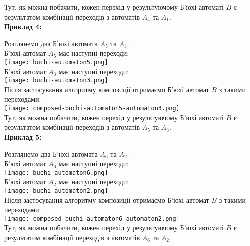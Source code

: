 \documentclass[12pt,a4paper]{article}
\begin{document}
Тут, як можна побачити, кожен перехід у результуючому Б'юхі автоматі \(B\) є результатом комбінації переходів з автоматів \(A_4\) та \(A_1\). \\

\vspace{1em}
\textbf{Приклад 4:}
\vspace{0.5em}

Розглянемо два Б'юхі автомата \(A_5\) та \(A_3\). \\

Б'юхі автомат \(A_5\) має наступні переходи: \\
\texttt{[image: buchi-automaton5.png]} \\

Б'юхі автомат \(A_3\) має наступні переходи: \\
\texttt{[image: buchi-automaton3.png]} \\

Після застосування алгоритму композиції отримаємо Б'юхі автомат \(B\) з такими переходами: \\
\texttt{[image: composed-buchi-automaton5-automaton3.png]} \\

Тут, як можна побачити, кожен перехід у результуючому Б'юхі автоматі \(B\) є результатом комбінації переходів з автоматів \(A_5\) та \(A_3\). \\

\vspace{1em}
\textbf{Приклад 5:}
\vspace{0.5em}

Розглянемо два Б'юхі автомата \(A_6\) та \(A_2\). \\

Б'юхі автомат \(A_6\) має наступні переходи: \\
\texttt{[image: buchi-automaton6.png]} \\

Б'юхі автомат \(A_2\) має наступні переходи: \\
\texttt{[image: buchi-automaton2.png]} \\

Після застосування алгоритму композиції отримаємо Б'юхі автомат \(B\) з такими переходами: \\
\texttt{[image: composed-buchi-automaton6-automaton2.png]} \\

Тут, як можна побачити, кожен перехід у результуючому Б'юхі автоматі \(B\) є результатом комбінації переходів з автоматів \(A_6\) та \(A_2\). \\
\end{document}
